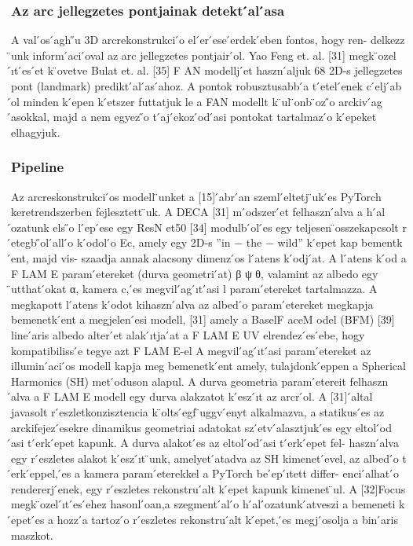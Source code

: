 \documentclass[12pt,a4]{article}
\begin{document}
	
	\subsubsection{Az arc jellegzetes pontjainak detekt ́al ́asa}
	A val ́os ́agh ̋u 3D arcrekonstrukci ́o el ́er ́ese  ́erdek ́eben fontos, hogy ren-
	delkezz ̈unk inform ́aci ́oval az arc jellegzetes pontjair ́ol.
	Yao Feng et. al. [31] megk ̈ozel ́ıt ́es ́et k ̈ovetve Bulat et. al. [35] F AN
	modellj ́et haszn ́aljuk 68 2D-s jellegzetes pont (landmark) predikt ́al ́as ́ahoz.
	A pontok robusztusabb ́a t ́etel ́enek c ́elj ́ab ́ol minden k ́epen k ́etszer futtatjuk le
	a FAN modellt k ̈ul ̈onb ̈oz ̋o arckiv ́ag ́asokkal, majd a nem egyez ̋o t ́aj ́ekoz ́od ́asi
	pontokat tartalmaz ́o k ́epeket elhagyjuk.
	
	\subsubsection{Pipeline}
	Az arcreskonstrukci ́os modell ̈unket a [15]  ́abr ́an szeml ́eltetj ̈uk  ́es PyTorch
	keretrendszerben fejlesztett ̈uk.
	A DECA [31] m ́odszer ́et felhaszn ́alva a h ́al ́ozatunk els ̋o l ́ep ́ese egy
	ResN et50 [34] modulb ́ol  ́es egy teljesen  ̈osszekapcsolt r ́etegb ̋ol  ́all ́o k ́odol ́o
	Ec, amely egy 2D-s ”in − the − wild” k ́epet kap bementk ́ent, majd vis-
	szaadja annak alacsony dimenz ́os l ́atens k ́odj ́at. A l ́atens k ́od a F LAM E
	param ́etereket (durva geometri ́at) β ψ θ, valamint az albedo egy ̈utthat ́okat
	α, kamera c,  ́es megvil ́ag ́ıt ́asi l param ́etereket tartalmazza.
	A megkapott l ́atens k ́odot kihaszn ́alva az albed ́o param ́etereket megkapja
	bemenetk ́ent a megjelen ́esi modell, [31] amely a BaselF aceM odel (BFM)
	[39] line ́aris albedo alter ́et alak ́ıtja  ́at a F LAM E UV elrendez ́es ́ebe,
	hogy kompatibiliss ́e tegye azt F LAM E-el A megvil ́ag ́ıt ́asi param ́etereket
	az illumin ́aci ́os modell kapja meg bemenetk ́ent amely, tulajdonk ́eppen
	a Spherical Harmonics (SH) met ́oduson alapul. A durva geometria
	param ́etereit felhaszn ́alva a F LAM E modell egy durva alakzatot k ́esz ́ıt az
	arcr ́ol. A [31]  ́altal javasolt r ́eszletkonzisztencia k ̈olts ́egf ̈uggv ́enyt alkalmazva,
	a statikus  ́es az arckifejez ́esekre dinamikus geometriai adatokat sz ́etv ́alasztjuk
	́es egy eltol ́od ́asi t ́erk ́epet kapunk. A durva alakot  ́es az eltol ́od ́asi t ́erk ́epet fel-
	haszn ́alva egy r ́eszletes alakot k ́esz ́ıt ̈unk, amelyet  ́atadva az SH kimenet ́evel,
	az albed ́o t ́erk ́eppel,  ́es a kamera param ́eterekkel a PyTorch be ́ep ́ıtett differ-
	enci ́alhat ́o rendererj ́enek, egy r ́eszletes rekonstru ́alt k ́epet kapunk kimenet ̈ul.
	A [32]Focus megk ̈ozel ́ıt ́es ́ehez hasonl ́oan,a szegment ́al ́o h ́al ́ozatunk  ́atveszi
	a bemeneti k ́epet  ́es a hozz ́a tartoz ́o r ́eszletes rekonstru ́alt k ́epet,  ́es
	megj ́osolja a bin ́aris maszkot.
	
\end{document}
